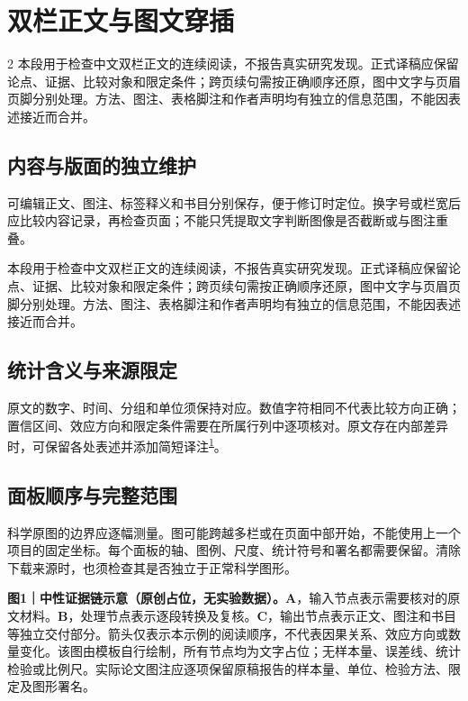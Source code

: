 \documentclass[UTF8,fontset=none,scheme=plain]{ctexart}
\renewcommand{\normalsize}{\fontsize{9.05bp}{12.1bp}\selectfont}
\newcommand{\NGCite}[1]{\textsuperscript{\hyperlink{ref:#1}{#1}}}
\newenvironment{NGColumns}{\begin{multicols}{2}\normalsize}{\end{multicols}}
\newcommand{\NGNeutral}{本段用于检查中文双栏正文的连续阅读，不报告真实研究发现。正式译稿应保留论点、证据、比较对象和限定条件；跨页续句需按正确顺序还原，图中文字与页眉页脚分别处理。方法、图注、表格脚注和作者声明均有独立的信息范围，不能因表述接近而合并。\par}
\begin{document}
\section*{双栏正文与图文穿插}
\begin{NGColumns}
\NGNeutral
\subsection*{内容与版面的独立维护}
可编辑正文、图注、标签释义和书目分别保存，便于修订时定位。换字号或栏宽后应比较内容记录，再检查页面；不能只凭提取文字判断图像是否截断或与图注重叠。\par
\NGNeutral
\subsection*{统计含义与来源限定}
原文的数字、时间、分组和单位须保持对应。数值字符相同不代表比较方向正确；置信区间、效应方向和限定条件需要在所属行列中逐项核对。原文存在内部差异时，可保留各处表述并添加简短译注\NGCite{1}。
\subsection*{面板顺序与完整范围}
科学原图的边界应逐幅测量。图可能跨越多栏或在页面中部开始，不能使用上一个项目的固定坐标。每个面板的轴、图例、尺度、统计符号和署名都需要保留。清除下载来源时，也须检查其是否独立于正常科学图形。
\end{NGColumns}
\vspace{6bp}\noindent\begin{minipage}{\linewidth}\centering
\begin{minipage}{.83\linewidth}\DemoVector\end{minipage}\par\vspace{5bp}
{\sffamily\fontsize{7.6bp}{9.2bp}\selectfont\raggedright\textbf{图1｜中性证据链示意（原创占位，无实验数据）。}\textbf{A}，输入节点表示需要核对的原文材料。\textbf{B}，处理节点表示逐段转换及复核。\textbf{C}，输出节点表示正文、图注和书目等独立交付部分。箭头仅表示本示例的阅读顺序，不代表因果关系、效应方向或数量变化。该图由模板自行绘制，所有节点均为文字占位；无样本量、误差线、统计检验或比例尺。实际论文图注应逐项保留原稿报告的样本量、单位、检验方法、限定及图形署名。\par}
\end{minipage}\par\vspace{6bp}
\end{document}
